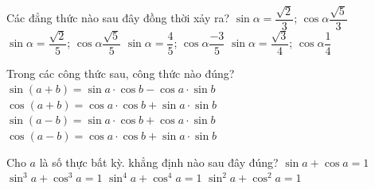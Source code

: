 

\begin{ex}%
	Các đẳng thức nào sau đây đồng thời  xảy ra?
	\choice 
		{$\sin \alpha =\dfrac{\sqrt{2}}{3} $; $\cos\alpha  \dfrac{\sqrt{5}}{3} $}
		{$\sin \alpha =\dfrac{\sqrt{2}}{5} $; $\cos\alpha \dfrac{\sqrt{5}}{5}  $}
		{\True $\sin \alpha =\dfrac{4}{5} $; $\cos\alpha \dfrac{-3}{5}  $}
		{$\sin \alpha =\dfrac{\sqrt{3}}{4} $; $\cos\alpha \dfrac{1}{4}  $}
\end{ex}

\begin{ex}%
	Trong  các công thức sau, công thức nào đúng?
	\choice 
		{$\sin (a+b)=\sin  a \cdot \cos b-\cos a \cdot \sin b$}
		{$\cos (a+b)=\cos  a \cdot \cos b+\sin a \cdot \sin b$}
		{$\sin (a-b)=\sin a \cdot \cos b+\cos  a \cdot \sin b$}
		{\True $\cos (a-b)=\cos a \cdot \cos b+\sin  a \cdot \sin b$}
\end{ex}

\begin{ex}%
	Cho $a$ là số  thực bất kỳ. khẳng định nào sau đây đúng?
	\choice 
		 {$\sin a+\cos a=1$}
		{$\sin ^{3} a+\cos ^{3} a=1$} 
		{$\sin ^{4}  a+\cos ^{4} a=1$}
		{\True $\sin ^{2} a+\cos ^{2}  a=1$}
\end{ex}

